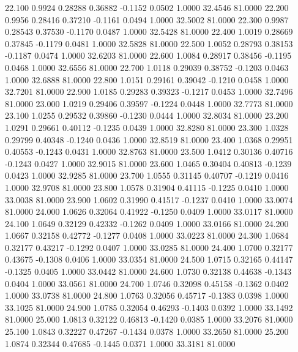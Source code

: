   22.100   0.9924   0.28288   0.36882  -0.1152   0.0502   1.0000  32.4546  81.0000
  22.200   0.9956   0.28416   0.37210  -0.1161   0.0494   1.0000  32.5002  81.0000
  22.300   0.9987   0.28543   0.37530  -0.1170   0.0487   1.0000  32.5428  81.0000
  22.400   1.0019   0.28669   0.37845  -0.1179   0.0481   1.0000  32.5828  81.0000
  22.500   1.0052   0.28793   0.38153  -0.1187   0.0474   1.0000  32.6203  81.0000
  22.600   1.0084   0.28917   0.38456  -0.1195   0.0468   1.0000  32.6556  81.0000
  22.700   1.0118   0.29039   0.38752  -0.1203   0.0463   1.0000  32.6888  81.0000
  22.800   1.0151   0.29161   0.39042  -0.1210   0.0458   1.0000  32.7201  81.0000
  22.900   1.0185   0.29283   0.39323  -0.1217   0.0453   1.0000  32.7496  81.0000
  23.000   1.0219   0.29406   0.39597  -0.1224   0.0448   1.0000  32.7773  81.0000
  23.100   1.0255   0.29532   0.39860  -0.1230   0.0444   1.0000  32.8034  81.0000
  23.200   1.0291   0.29661   0.40112  -0.1235   0.0439   1.0000  32.8280  81.0000
  23.300   1.0328   0.29799   0.40348  -0.1240   0.0436   1.0000  32.8519  81.0000
  23.400   1.0368   0.29951   0.40553  -0.1243   0.0431   1.0000  32.8763  81.0000
  23.500   1.0412   0.30136   0.40716  -0.1243   0.0427   1.0000  32.9015  81.0000
  23.600   1.0465   0.30404   0.40813  -0.1239   0.0423   1.0000  32.9285  81.0000
  23.700   1.0555   0.31145   0.40707  -0.1219   0.0416   1.0000  32.9708  81.0000
  23.800   1.0578   0.31904   0.41115  -0.1225   0.0410   1.0000  33.0038  81.0000
  23.900   1.0602   0.31990   0.41517  -0.1237   0.0410   1.0000  33.0074  81.0000
  24.000   1.0626   0.32064   0.41922  -0.1250   0.0409   1.0000  33.0117  81.0000
  24.100   1.0649   0.32129   0.42332  -0.1262   0.0409   1.0000  33.0166  81.0000
  24.200   1.0667   0.32158   0.42772  -0.1277   0.0408   1.0000  33.0223  81.0000
  24.300   1.0684   0.32177   0.43217  -0.1292   0.0407   1.0000  33.0285  81.0000
  24.400   1.0700   0.32177   0.43675  -0.1308   0.0406   1.0000  33.0354  81.0000
  24.500   1.0715   0.32165   0.44147  -0.1325   0.0405   1.0000  33.0442  81.0000
  24.600   1.0730   0.32138   0.44638  -0.1343   0.0404   1.0000  33.0561  81.0000
  24.700   1.0746   0.32098   0.45158  -0.1362   0.0402   1.0000  33.0738  81.0000
  24.800   1.0763   0.32056   0.45717  -0.1383   0.0398   1.0000  33.1025  81.0000
  24.900   1.0785   0.32054   0.46293  -0.1403   0.0392   1.0000  33.1492  81.0000
  25.000   1.0813   0.32122   0.46813  -0.1420   0.0385   1.0000  33.2076  81.0000
  25.100   1.0843   0.32227   0.47267  -0.1434   0.0378   1.0000  33.2650  81.0000
  25.200   1.0874   0.32344   0.47685  -0.1445   0.0371   1.0000  33.3181  81.0000
